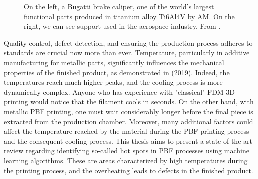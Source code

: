 \begin{figure}
    \centering
    \quad
    \caption[Functional AM part printed in metal.]{On the left, a Bugatti brake caliper, one of the world’s largest functional parts produced in titanium alloy Ti6Al4V by AM. On the right, we can see support used in the aerospace industry. From \citeauthor{du_plessis_beautiful_2019}.}
    \label{fig:funcpart}
\end{figure}
Quality control, defect detection, and ensuring the production process adheres to standards are crucial now more than ever. Temperature, particularly in additive manufacturing for metallic parts, significantly influences the mechanical properties of the finished product, as demonstrated in \citeauthor{williams_situ_2019} (2019). Indeed, the temperatures reach much higher peaks, and the cooling process is more dynamically complex. Anyone who has experience with "classical" FDM 3D printing would notice that the filament cools in seconds. On the other hand, with metallic PBF printing, one must wait considerably longer before the final piece is extracted from the production chamber. Moreover, many additional factors could affect the temperature reached by the material during the PBF printing process and the consequent cooling process. This thesis aims to present a state-of-the-art review regarding identifying so-called hot spots in PBF processes using machine learning algorithms. These are areas characterized by high temperatures during the printing process, and the overheating leads to defects in the finished product.

